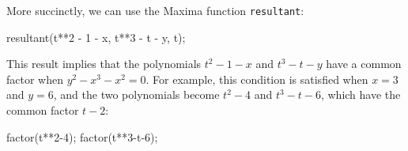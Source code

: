 More succinctly, we can use the Maxima function {\tt resultant}:

\begin{maximacode}
resultant(t**2 - 1 - x, t**3 - t - y, t);
\end{maximacode}

This result implies that the polynomials $t^2-1-x$ and $t^3-t-y$
have a common factor when $y^2-x^3-x^2=0$.  For example,
this condition is satisfied when $x=3$ and $y=6$, and
the two polynomials become $t^2-4$ and $t^3-t-6$, which
have the common factor $t-2$:

\begin{maximacode}
factor(t**2-4);
factor(t**3-t-6);
\end{maximacode}

\endexample


\vfill\eject

